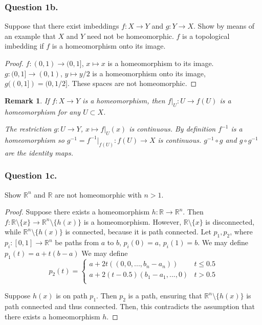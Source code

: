 \documentclass[12pt]{article}
\newtheorem{remark}{Remark}
\begin{document}
\subsubsection*{Question 1b.} Suppose that there exist imbeddings $f : X \rightarrow Y$ and $g : Y \rightarrow X$.
Show by
means of an example that $X$ and $Y$ need not be homeomorphic.
$f$ is a topological imbedding if $f$ is a homeomorphism onto its image.
\begin{proof}
    $f : (0, 1) \rightarrow (0, 1]$,  $x \mapsto x$ is a homeomorphism to its image.
    $g: (0, 1] \rightarrow (0, 1)$, $y \mapsto y/2$ is a homeomorphism onto its image,
    $g((0, 1]) = (0, 1/2]$.
    These spaces are not homeomorphic.
\end{proof}

\begin{remark}
    If $f:X \rightarrow Y$
        is a homeomorphism, then $f|_U:U \rightarrow f(U)$
        is a homeomorphism for any $U \subset X$.

    The restriction $g: U \rightarrow Y$, $x \mapsto f|_U(x)$
    is continuous. By definition $f^{-1}$ is a homeomorphism 
    so $g^{-1} = f^{-1}|_{f(U)}: f(U) \rightarrow X$ is continuous. 
    $g^{-1} \circ g $ and $g \circ g^{-1}$ are the identity maps.  

\end{remark}
\subsubsection*{Question 1c.} Show $\mathbb{R}^n$ and $\mathbb{R}$ are not homeomorphic with $n > 1$.

\begin{proof}
    Suppose there exists a homeomorphism $h: \mathbb{R} \rightarrow \mathbb{R}^n$.
    Then $f: \mathbb{R} \setminus \{x\} \rightarrow \mathbb{R}^n \setminus \{h(x)\}$
    is a homeomorphism. However, $\mathbb{R} \setminus \{x\}$ is disconnected, 
    while $\mathbb{R}^n \setminus \{h(x)\}$ is connected, because it is path connected.
    Let $p_1, p_2$, where $p_i: [0, 1] \rightarrow \mathbb{R}^n$ be paths from $a$ to $b$,
    $p_i(0) = a$, $p_i(1) = b$.
    We may define $p_1(t) = a + t(b - a)$
    We may define $$p_2(t) = \begin{cases}
        a + 2t((0, 0, ..., b_n - a_n)) & t \leq 0.5\\
        a + 2(t-0.5)(b_1-a_1, ..., 0) & t > 0.5\\ 
    \end{cases}$$

    Suppose $h(x)$ is on path $p_1$. Then $p_2$ is a path, ensuring that 
    $\mathbb{R}^n \setminus \{h(x)\}$ is path connected and thus connected.
    Then, this contradicts the assumption that there exists a homeomorphism $h$.
\end{proof}
\end{document}
